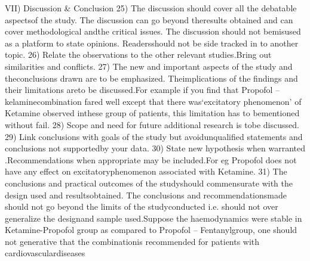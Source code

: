 \documentclass{article}
\begin{document}
	VII) Discussion & Conclusion
	25) The discussion should cover all the debatable  aspectsof the study. The discussion  can go beyond theresults obtained and can cover methodological andthe critical issues. The discussion should not bemisused as a platform to state opinions. Readersshould not be side tracked in to another topic.
	26) Relate the observations to the other relevant studies.Bring out similarities and conflicts.
	27) The new and important aspects of the study and theconclusions drawn are to be emphasized.  Theimplications  of the findings and their limitations areto be discussed.For example if you find that  Propofol – kelaminecombination fared well except that there was‘excitatory phenomenon’ of Ketamine observed inthese group of patients, this limitation has to bementioned without fail.
	28) Scope  and need for future additional research is tobe  discussed.
	29) Link conclusions with goals of the study but avoidunqualified statements and conclusions not supportedby your data.
	30) State new hypothesis when warranted .Recommendations when appropriate may be included.For eg Propofol does not have any effect on excitatoryphenomenon associated with Ketamine.
	31) The conclusions and practical outcomes of the studyshould commensurate with the design used and resultsobtained.  The conclusions and recommendationsmade should not go beyond the limits of the studyconducted i.e. should not over generalize the designand sample used.Suppose the haemodynamics were stable in Ketamine-Propofol group as compared to Propofol – Fentanylgroup, one should not generative that the combinationis recommended for patients with cardiovasculardiseases
	
	
	
\end{document}
